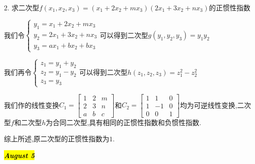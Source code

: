 2. 求二次型$f(x_{1},x_{2},x_{3})=(x_{1}+2x_{2}+mx_{3})(2x_{1}+3x_{2}+nx_{3})$的正惯性指数
\begin{solution}

	我们令$\left\lbrace
	\begin{array}{l}
		y_{1}=x_{1}+2x_{2}+mx_{3}\\
		y_{2}=2x_{1}+3x_{2}+nx_{3}\\
		y_{3}=ax_{1}+bx_{2}+bx_{3}
	\end{array}
	\right. $可以得到二次型$g(y_{1},y_{2},y_{3})=y_{1}y_{2}$
	
	我们再令$\left\lbrace
	\begin{array}{l}
		z_{1}=y_{1}+y_{2}\\
		z_{2}=y_{1}-y_{2}\\
		z_{3}=y_{3}
	\end{array}
	\right. $可以得到二次型$h(z_{1},z_{2},z_{3})=z_{1}^2-z_{2}^2$
	
	我们作的线性变换$C_{1}=\left[ \begin{matrix}
		1&2&m\\2&3&n\\a&b&c
	\end{matrix}\right] $和$C_{2}=\left[ \begin{matrix}
	1&1&0\\1&-1&0\\0&0&1
\end{matrix}\right] $均为可逆线性变换,二次型$f$和二次型$h$为合同二次型,具有相同的正惯性指数和负惯性指数.

综上所述,原二次型的正惯性指数为$1$.
\end{solution}

\hl{\textbf{\textit{August 5}}}

